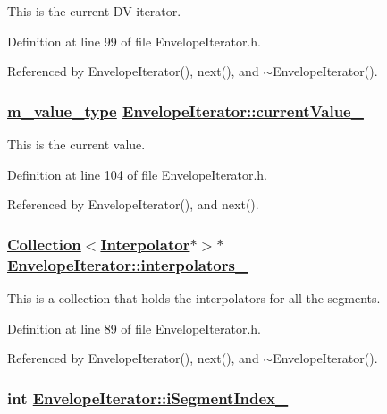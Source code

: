 This is the current DV iterator. 

Definition at line 99 of file Envelope\-Iterator.h.

Referenced by Envelope\-Iterator(), next(), and $\sim$Envelope\-Iterator().\hypertarget{classEnvelopeIterator_r3}{
\subsubsection[currentValue\_\-]{\setlength{\rightskip}{0pt plus 5cm}\hyperlink{Types_8h_a3}{m\_\-value\_\-type} \hyperlink{classEnvelopeIterator_r3}{Envelope\-Iterator::current\-Value\_\-}}}
\label{classEnvelopeIterator_r3}


This is the current value. 

Definition at line 104 of file Envelope\-Iterator.h.

Referenced by Envelope\-Iterator(), and next().\hypertarget{classEnvelopeIterator_r0}{
\subsubsection[interpolators\_\-]{\setlength{\rightskip}{0pt plus 5cm}\hyperlink{classCollection}{Collection}$<$\hyperlink{classInterpolator}{Interpolator}$\ast$$>$$\ast$ \hyperlink{classEnvelopeIterator_r0}{Envelope\-Iterator::interpolators\_\-}}}
\label{classEnvelopeIterator_r0}


This is a collection that holds the interpolators for all the segments. 

Definition at line 89 of file Envelope\-Iterator.h.

Referenced by Envelope\-Iterator(), next(), and $\sim$Envelope\-Iterator().\hypertarget{classEnvelopeIterator_r1}{
\subsubsection[iSegmentIndex\_\-]{\setlength{\rightskip}{0pt plus 5cm}int \hyperlink{classEnvelopeIterator_r1}{Envelope\-Iterator::i\-Segment\-Index\_\-}}}
\label{classEnvelopeIterator_r1}


